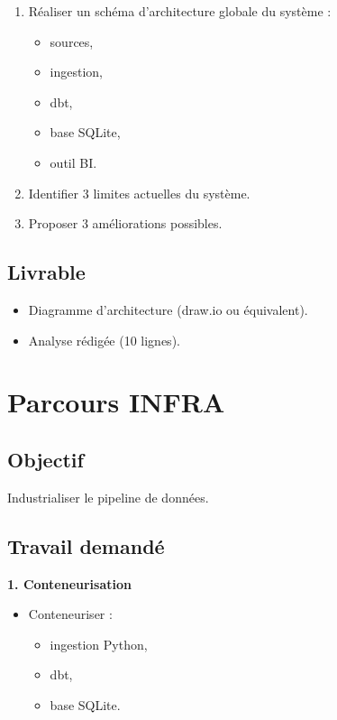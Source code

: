 \documentclass[11pt,a4paper]{article}
\begin{document}
\begin{enumerate}
  \item Réaliser un schéma d’architecture globale du système :
  \begin{itemize}
    \item sources,
    \item ingestion,
    \item dbt,
    \item base SQLite,
    \item outil BI.
  \end{itemize}
  \item Identifier 3 limites actuelles du système.
  \item Proposer 3 améliorations possibles.
\end{enumerate}

\subsection*{Livrable}

\begin{itemize}
  \item Diagramme d’architecture (draw.io ou équivalent).
  \item Analyse rédigée (10 lignes).
\end{itemize}

\section*{Parcours INFRA}

\subsection*{Objectif}

Industrialiser le pipeline de données.

\subsection*{Travail demandé}

\textbf{1. Conteneurisation}

\begin{itemize}
  \item Conteneuriser :
  \begin{itemize}
    \item ingestion Python,
    \item dbt,
    \item base SQLite.
  \end{itemize}
\end{itemize}
\end{document}
